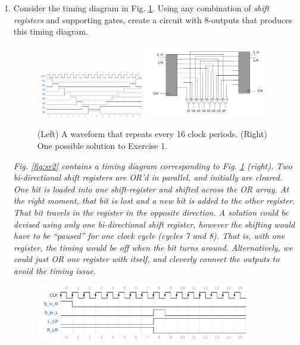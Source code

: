 \documentclass[10pt]{article}
\begin{document}
\begin{enumerate}
\item Consider the timing diagram in Fig. \ref{fig:sr1}.  Using any combination of \textit{shift registers} and supporting gates, create a circuit with 8-outputs that produces this timing diagram. \\
\begin{figure}[ht]
\centering
\includegraphics[width=0.45\textwidth]{figures/timingExample15.pdf}
\includegraphics[width=0.5\textwidth]{figures/design10.pdf}
\caption{\label{fig:sr1} (Left) A waveform that repeats every 16 clock periods. (Right) One possible solution to Exercise 1.}
\end{figure}
\textit{Fig. \ref{fig:sr2} contains a timing diagram corresponding to Fig. \ref{fig:sr1} (right).  Two bi-directional shift registers are OR'd in parallel, and initially are cleared.  One bit is loaded into one shift-register and shifted across the OR array.  At the right moment, that bit is lost and a new bit is added to the other register.  That bit travels in the register in the opposite direction.  A solution could be devised using only one bi-directional shift register, however the shifting would have to be ``paused'' for one clock cycle (cycles 7 and 8).  That is, with one register, the timing would be off when the bit turns around.  Alternatively, we could just OR one register with itself, and cleverly connect the outputs to avoid the timing issue.}
\begin{figure}[ht]
\centering
\includegraphics[width=0.9\textwidth]{figures/timingExample19.pdf}

\end{figure}
\end{enumerate}
\end{document}
